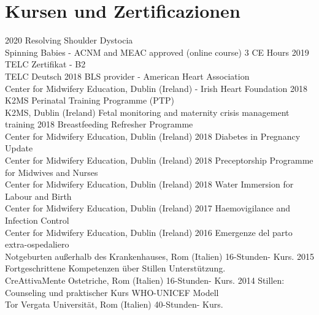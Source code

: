 \documentclass[11pt]{friggeri-cv}
\begin{document}
\section{Kursen und Zertificazionen}
\begin{entrylist}
  \entry
    {2020}
    {Resolving Shoulder Dystocia}
    {\\Spinning Babies - ACNM and MEAC approved (online course)}
    {3 CE Hours}
  \entry
    {2019}
    {TELC Zertifikat - B2}
    {\\TELC Deutsch}
    {\vspace{-10pt}}
  \entry
    {2018}
    {BLS provider - American Heart Association}
    {\\Center for Midwifery Education, Dublin (Ireland) - Irish Heart Foundation}
    {\vspace{-10pt}}
  \entry
    {2018}
    {K2MS Perinatal Training Programme (PTP)}
    {\\K2MS, Dublin (Ireland)}
    {Fetal monitoring and maternity crisis management training}
  \entry
    {2018}
    {Breastfeeding Refresher Programme}
    {\\Center for Midwifery Education, Dublin (Ireland)}
    {\vspace{-10pt}}
  \entry
    {2018}
    {Diabetes in Pregnancy Update}
    {\\Center for Midwifery Education, Dublin (Ireland)}
    {\vspace{-10pt}}
  \entry
    {2018}
    {Preceptorship Programme for Midwives and Nurses}
    {\\Center for Midwifery Education, Dublin (Ireland)}
    {\vspace{-10pt}}
  \entry
    {2018}
    {Water Immersion for Labour and Birth}
    {\\Center for Midwifery Education, Dublin (Ireland)}
    {\vspace{-10pt}}
  \entry
    {2017}
    {Haemovigilance and Infection Control}
    {\\Center for Midwifery Education, Dublin (Ireland)}
    {\vspace{-10pt}}
  \entry
    {2016}
    {Emergenze del parto extra-ospedaliero}
    {\\Notgeburten außerhalb des Krankenhauses, Rom (Italien)}
    {16-Stunden- Kurs.}
  \entry
    {2015}
    {Fortgeschrittene Kompetenzen \"{u}ber Stillen Unterst\"{u}tzung.}
    {\\CreAttivaMente Ostetriche, Rom (Italien)}
    {16-Stunden- Kurs.}
  \entry
    {2014}
    {Stillen: Counseling und praktischer Kurs WHO-UNICEF Modell}
    {\\Tor Vergata Universit\"{a}t, Rom (Italien)}
    {40-Stunden- Kurs.}
\end{entrylist}
\end{document}

